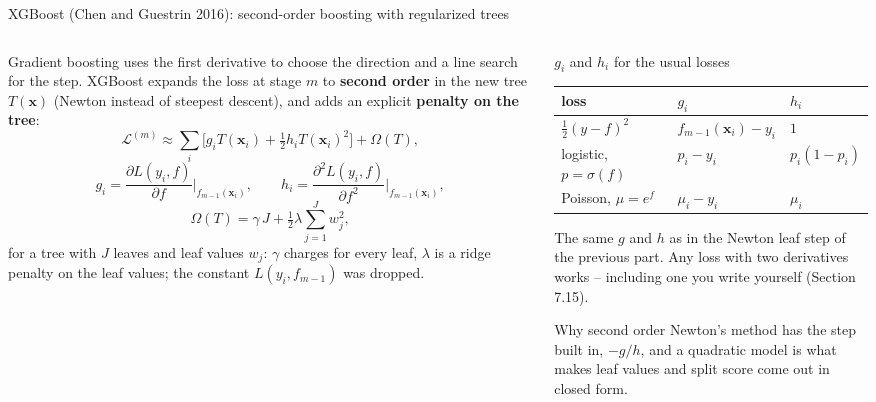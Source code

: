 \documentclass[10pt,aspectratio=169]{beamer}
\begin{document}
\begin{frame}{XGBoost (Chen and Guestrin 2016): second-order boosting with regularized trees}
\begin{columns}[T]
\begin{column}{0.56\textwidth}
\footnotesize
Gradient boosting uses the first derivative to choose the direction and a
line search for the step.  XGBoost expands the loss at stage $m$ to
\textbf{second order} in the new tree $T(\bm{x})$ (Newton instead of
steepest descent), and adds an explicit \textbf{penalty on the tree}:
\[
\mathcal{L}^{(m)}\approx\sum_{i}\Big[g_iT(\bm{x}_i)+\tfrac12h_iT(\bm{x}_i)^2\Big]+\Omega(T),\tag{7.33}
\]
\[
g_i=\frac{\partial L(y_i,f)}{\partial f}\Big|_{f_{m-1}(\bm{x}_i)},\qquad
h_i=\frac{\partial^2L(y_i,f)}{\partial f^2}\Big|_{f_{m-1}(\bm{x}_i)},
\]
\[
\Omega(T)=\gamma\,J+\tfrac12\lambda\sum_{j=1}^Jw_j^2,\tag{7.34}
\]
for a tree with $J$ leaves and leaf values $w_j$: $\gamma$ charges for every
leaf, $\lambda$ is a ridge penalty on the leaf values; the constant
$L(y_i,f_{m-1})$ was dropped.

\end{column}
\begin{column}{0.42\textwidth}
\begin{block}{$g_i$ and $h_i$ for the usual losses}
\footnotesize
\setlength{\tabcolsep}{4pt}%
\begin{tabular}{@{}lll@{}}
\toprule
loss & $g_i$ & $h_i$\\
\midrule
$\frac12(y-f)^2$ & $f_{m-1}(\bm{x}_i)-y_i$ & $1$\\
logistic, $p=\sigma(f)$ & $p_i-y_i$ & $p_i(1-p_i)$\\
Poisson, $\mu=e^{f}$ & $\mu_i-y_i$ & $\mu_i$\\
\bottomrule
\end{tabular}
\medskip

The same $g$ and $h$ as in the Newton leaf step of the previous part.  Any
loss with two derivatives works -- including one you write yourself
(Section 7.15).
\end{block}
\begin{block}{Why second order}
\footnotesize
Newton's method has the step built in, $-g/h$, and a quadratic model is
what makes leaf values and split score come out in closed form.
\end{block}
\end{column}
\end{columns}
\end{frame}
\end{document}
